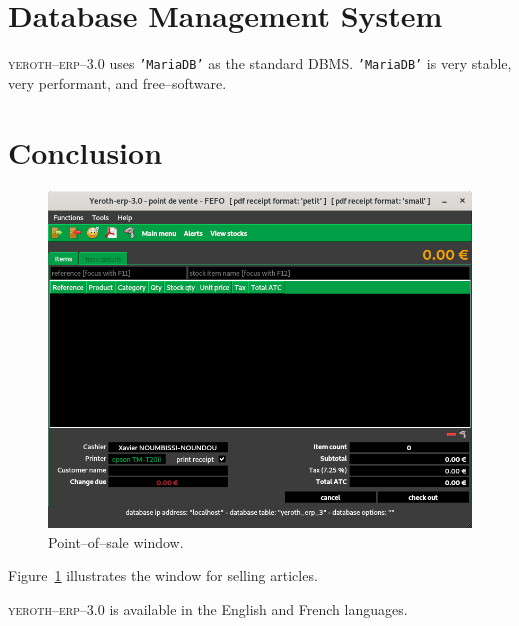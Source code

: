 \documentclass[a4paper, 10pt, twocolumn]{article}
\newcommand{\yeren}{\textsc{yeroth--erp--3.0}\xspace}
\newcommand{\mariadb}{\texttt{'MariaDB'}\xspace}
\begin{document}
\vspace{-1.5em}
\section{Database Management System}
\vspace{-0.9em}
\yeren uses \mariadb as the standard DBMS. 
\mariadb is very stable, very performant,
and free--software.

\vspace{-1em}
\section{Conclusion}
\vspace{-0.9em}
\begin{figure}[!htbp]
\centering
\includegraphics[scale=0.33]{../../francais/images/yeren-pos-7-0-window-cashier.png}
\caption{Point--of--sale window.}
\label{fig:fenetre-de-vente}
\end{figure}

Figure~\ref{fig:fenetre-de-vente} illustrates the window
for selling articles.

\yeren is available in the English and French languages.
\end{document}
